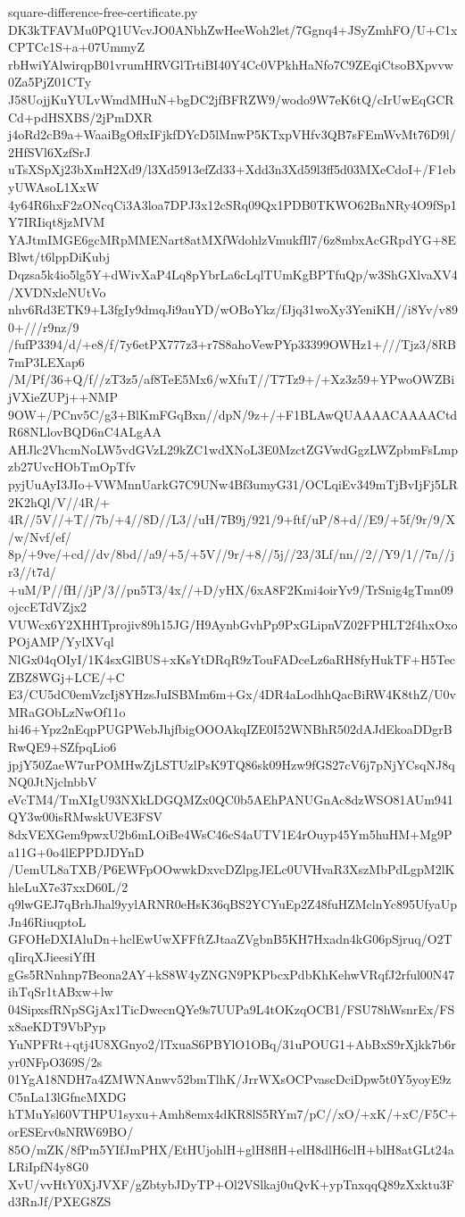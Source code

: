 \documentclass[11pt]{article}
\theoremstyle{definition}
\theoremstyle{remark}
\begin{document}
\begin{filecontents*}[overwrite]{square-difference-free-certificate.py}
DK3kTFAVMu0PQ1UVcvJO0ANbhZwHeeWoh2let/7Ggnq4+JSyZmhFO/U+C1xCPTCc1S+a+07UmmyZ
rbHwiYAlwirqpB01vrumHRVGlTrtiBI40Y4Cc0VPkhHaNfo7C9ZEqiCtsoBXpvvw0Za5PjZ01CTy
J58UojjKuYULvWmdMHuN+bgDC2jfBFRZW9/wodo9W7eK6tQ/cIrUwEqGCRCd+pdHSXBS/2jPmDXR
j4oRd2cB9a+WaaiBgOflxIFjkfDYcD5lMnwP5KTxpVHfv3QB7sFEmWvMt76D9l/2HfSVl6XzfSrJ
uTsXSpXj23bXmH2Xd9/l3Xd5913efZd33+Xdd3n3Xd59l3ff5d03MXeCdoI+/F1ebyUWAsoL1XxW
4y64R6hxF2zONcqCi3A3loa7DPJ3x12cSRq09Qx1PDB0TKWO62BnNRy4O9fSp1Y7IRIiqt8jzMVM
YAJtmIMGE6gcMRpMMENart8atMXfWdohlzVmukfIl7/6z8mbxAcGRpdYG+8EBlwt/t6lppDiKubj
Dqzsa5k4io5lg5Y+dWivXaP4Lq8pYbrLa6cLqlTUmKgBPTfuQp/w3ShGXlvaXV4/XVDNxleNUtVo
nhv6Rd3ETK9+L3fgIy9dmqJi9auYD/wOBoYkz/fJjq31woXy3YeniKH//i8Yv/v890+///r9nz/9
/fufP3394/d/+e8/f/7y6etPX777z3+r7S8ahoVewPYp33399OWHz1+///Tjz3/8RB7mP3LEXap6
/M/Pf/36+Q/f//zT3z5/af8TeE5Mx6/wXfuT//T7Tz9+/+Xz3z59+YPwoOWZBijVXieZUPj++NMP
9OW+/PCnv5C/g3+BlKmFGqBxn//dpN/9z+/+F1BLAwQUAAAACAAAACtdR68NLlovBQD6nC4ALgAA
AHJlc2VhcmNoLW5vdGVzL29kZC1wdXNoL3E0MzctZGVwdGgzLWZpbmFsLmpzb27UvcHObTmOpTfv
pyjUuAyI3JIo+VWMnnUarkG7C9UNw4Bf3umyG31/OCLqiEv349mTjBvIjFj5LR2K2hQl/V//4R/+
4R//5V//+T//7b/+4//8D//L3//uH/7B9j/921/9+ftf/uP/8+d//E9/+5f/9r/9/X/w/Nvf/ef/
8p/+9ve/+cd//dv/8bd//a9/+5/+5V//9r/+8//5j//23/3Lf/nn//2//Y9/1//7n//jr3//t7d/
+uM/P//fH//jP/3//pn5T3/4x//+D/yHX/6xA8F2Kmi4oirYv9/TrSnig4gTmn09ojccETdVZjx2
VUWcx6Y2XHHTprojiv89h15JG/H9AynbGvhPp9PxGLipnVZ02FPHLT2f4hxOxoPOjAMP/YylXVql
NlGx04qOIyI/1K4sxGlBUS+xKsYtDRqR9zTouFADceLz6aRH8fyHukTF+H5TecZBZ8WGj+LCE/+C
E3/CU5dC0emVzcIj8YHzsJuISBMm6m+Gx/4DR4aLodhhQacBiRW4K8thZ/U0vMRaGObLzNwOf11o
hi46+Ypz2nEqpPUGPWebJhjfbigOOOAkqIZE0I52WNBhR502dAJdEkoaDDgrBRwQE9+SZfpqLio6
jpjY50ZaeW7urPOMHwZjLSTUzlPsK9TQ86sk09Hzw9fGS27cV6j7pNjYCsqNJ8qNQ0JtNjclnbbV
eVcTM4/TmXIgU93NXkLDGQMZx0QC0b5AEhPANUGnAc8dzWSO81AUm941QY3w00isRMwskUVE3FSV
8dxVEXGem9pwxU2b6mLOiBe4WsC46cS4aUTV1E4rOuyp45Ym5huHM+Mg9Pa11G+0o4lEPPDJDYnD
/UemUL8aTXB/P6EWFpOOwwkDxvcDZlpgJELc0UVHvaR3XszMbPdLgpM2lKhleLuX7e37xxD60L/2
q9lwGEJ7qBrhJhal9yylARNR0eHsK36qBS2YCYuEp2Z48fuHZMclnYc895UfyaUpJn46RiuqptoL
GFOHeDXIAluDn+hclEwUwXFFftZJtaaZVgbnB5KH7Hxadn4kG06pSjruq/O2TqIirqXJieesiYfH
gGs5RNnhnp7Beona2AY+kS8W4yZNGN9PKPbcxPdbKhKehwVRqfJ2rful00N47ihTqSr1tABxw+lw
04SipxsfRNpSGjAx1TicDwecnQYe9s7UUPa9L4tOKzqOCB1/FSU78hWsnrEx/FSx8aeKDT9VbPyp
YuNPFRt+qtj4U8XGnyo2/lTxuaS6PBYlO1OBq/31uPOUG1+AbBxS9rXjkk7b6ryr0NFpO369S/2s
01YgA18NDH7a4ZMWNAnwv52bmTlhK/JrrWXsOCPvascDciDpw5t0Y5yoyE9zC5nLa13lGfncMXDG
hTMuYsl60VTHPU1syxu+Amh8emx4dKR8lS5RYm7/pC//xO/+xK/+xC/F5C+orESErv0sNRW69BO/
85O/mZK/8fPm5YIfJmPHX/EtHUjohlH+glH8flH+elH8dlH6clH+blH8atGLt24aLRiIpfN4y8G0
XvU/vvHtY0XjJVXF/gZbtybJDyTP+Ol2VSlkaj0uQvK+ypTnxqqQ89zXxktu3Fd3RnJf/PXEG8ZS

\end{filecontents*}
\end{document}
